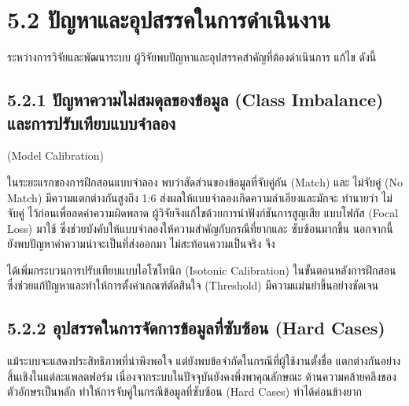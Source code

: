 \documentclass[12pt,a4paper]{report}
\begin{document}
\section*{5.2 ปัญหาและอุปสรรคในการดำเนินงาน}
ระหว่างการวิจัยและพัฒนาระบบ ผู้วิจัยพบปัญหาและอุปสรรคสำคัญที่ต้องดำเนินการ แก้ไข ดังนี้\par
\subsection*{5.2.1 ปัญหาความไม่สมดุลของข้อมูล (Class Imbalance) และการปรับเทียบแบบจำลอง}
(Model Calibration)\par
ในระยะแรกของการฝึกสอนแบบจำลอง พบว่าสัดส่วนของข้อมูลที่จับคู่กัน (Match) และ ไม่จับคู่ (No Match) มีความแตกต่างกันสูงถึง 1:6 ส่งผลให้แบบจำลองเกิดความลำเอียงและมักจะ ทำนายว่า ไม่จับคู่ ไว้ก่อนเพื่อลดค่าความผิดพลาด ผู้วิจัยจึงแก้ไขด้วยการนำฟังก์ชันการสูญเสีย แบบโฟกัส (Focal Loss) มาใช้ ซึ่งช่วยบังคับให้แบบจำลองให้ความสำคัญกับกรณีที่ยากและ ซับซ้อนมากขึ้น นอกจากนี้ ยังพบปัญหาค่าความน่าจะเป็นที่ส่งออกมา ไม่สะท้อนความเป็นจริง จึง\par
\clearpage
ได้เพิ่มกระบวนการปรับเทียบแบบไอโซโทนิก (Isotonic Calibration) ในขั้นตอนหลังการฝึกสอน ซึ่งช่วยแก้ปัญหาและทำให้การตั้งค่าเกณฑ์ตัดสินใจ (Threshold) มีความแม่นยำขึ้นอย่างชัดเจน\par
\subsection*{5.2.2 อุปสรรคในการจัดการข้อมูลที่ซับซ้อน (Hard Cases)}
แม้ระบบจะแสดงประสิทธิภาพที่น่าพึงพอใจ แต่ยังพบข้อจำกัดในกรณีที่ผู้ใช้งานตั้งชื่อ แตกต่างกันอย่างสิ้นเชิงในแต่ละแพลตฟอร์ม เนื่องจากระบบในปัจจุบันยังคงพึ่งพาคุณลักษณะ ด้านความคล้ายคลึงของตัวอักษรเป็นหลัก ทำให้การจับคู่ในกรณีข้อมูลที่ซับซ้อน (Hard Cases) ทำได้ค่อนข้างยาก\par
\end{document}

